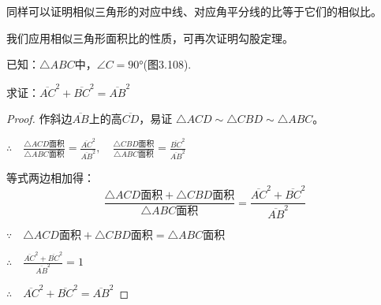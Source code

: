 同样可以证明相似三角形的对应中线、对应角平分线的比等于它们的相似比。

\begin{example}
我们应用相似三角形面积比的性质，可再次证明勾股定理。

已知：$\triangle ABC$中，$\angle C=\ang{90}$(图3.108).

求证：$\overline{AC}^2+\overline{BC}^2=\overline{AB}^2$
\end{example}

\begin{proof}
    作斜边$\overline{AB}$上的高$\overline{CD}$，易证
$    \triangle ACD\sim \triangle CBD\sim \triangle ABC$。

$\therefore\quad \frac{\triangle ACD\text{面积}}{\triangle ABC\text{面积}}=\frac{\overline{AC}^2}{\overline{AB}^2},\quad \frac{\triangle CBD\text{面积}}{\triangle ABC\text{面积}}=\frac{\overline{BC}^2}{\overline{AB}^2}$

    等式两边相加得：
\[ \frac{\triangle ACD\text{面积}+\triangle CBD\text{面积}}{\triangle ABC\text{面积}} =\frac{\overline{AC}^2+\overline{BC}^2}{\overline{AB}^2}\]

$\because\quad \triangle ACD\text{面积}+\triangle CBD\text{面积}=\triangle ABC\text{面积}$

$\therefore\quad \frac{\overline{AC}^2+\overline{BC}^2}{\overline{AB}^2}=1$

$\therefore\quad  \overline{AC}^2+\overline{BC}^2=\overline{AB}^2$
\end{proof}

\begin{figure}
    \begin{minipage}[t]{0.48\linewidth}
    \centering
  \begin{tikzpicture}[>=latex, scale=1]
    \end{tikzpicture}
    \caption{}
    \end{minipage}
    \begin{minipage}[t]{0.48\linewidth}
    \centering
    \begin{tikzpicture}[>=latex, scale=.7]

    \end{tikzpicture}
    \caption{}
    \end{minipage}
    \end{figure}

